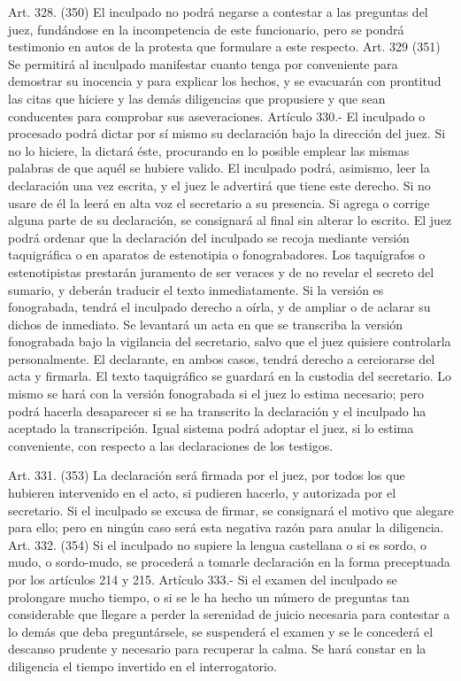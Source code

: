     Art. 328. (350) El inculpado no podrá negarse a contestar a las preguntas del juez, fundándose en la incompetencia de este funcionario, pero se pondrá testimonio en autos de la protesta que formulare a este respecto.
    Art. 329 (351) Se permitirá al inculpado manifestar cuanto tenga por conveniente para demostrar su inocencia y para explicar los hechos, y se evacuarán con prontitud las citas que hiciere y las demás diligencias que propusiere y que sean conducentes para comprobar sus aseveraciones.
    Artículo 330.- El inculpado o procesado podrá dictar por sí mismo su declaración bajo la dirección del juez. Si no lo hiciere, la dictará éste, procurando en lo posible emplear las mismas palabras de que aquél se hubiere valido.
    El inculpado podrá, asimismo, leer la declaración una vez escrita, y el juez le advertirá que tiene este derecho. Si no usare de él la leerá en alta voz el secretario a su presencia. Si agrega o corrige alguna parte de su declaración, se consignará al final sin alterar lo escrito.
    El juez podrá ordenar que la declaración del inculpado se recoja mediante versión taquigráfica o en aparatos de estenotipia o fonograbadores.
    Los taquígrafos o estenotipistas prestarán juramento de ser veraces y de no revelar el secreto del sumario, y deberán traducir el texto inmediatamente.
    Si la versión es fonograbada, tendrá el inculpado derecho a oírla, y de ampliar o de aclarar su dichos de inmediato.  Se levantará un acta en que se transcriba la versión fonograbada bajo la vigilancia del secretario, salvo que el juez quisiere controlarla personalmente. El declarante, en ambos casos, tendrá derecho a cerciorarse del acta y firmarla.
    El texto taquigráfico se guardará en la custodia del secretario.  Lo mismo se hará con la versión fonograbada si el juez lo estima necesario; pero podrá hacerla desaparecer si se ha transcrito la declaración y el inculpado ha aceptado la transcripción.
    Igual sistema podrá adoptar el juez, si lo estima conveniente, con respecto a las declaraciones de los testigos.

    Art. 331. (353) La declaración será firmada por el juez, por todos los que hubieren intervenido en el acto, si pudieren hacerlo, y autorizada por el secretario.
    Si el inculpado se excusa de firmar, se consignará el motivo que alegare para ello; pero en ningún caso será esta negativa razón para anular la diligencia.
    Art. 332. (354) Si el inculpado no supiere la lengua castellana o si es sordo, o mudo, o sordo-mudo, se procederá a tomarle declaración en la forma preceptuada por los artículos 214 y 215.
    Artículo 333.- Si el examen del inculpado se prolongare mucho tiempo, o si se le ha hecho un número de preguntas tan considerable que llegare a perder la serenidad de juicio necesaria para contestar a lo demás que deba preguntársele, se suspenderá el examen y se le concederá el descanso prudente y necesario para recuperar la calma.
    Se hará constar en la diligencia el tiempo invertido en el interrogatorio.

